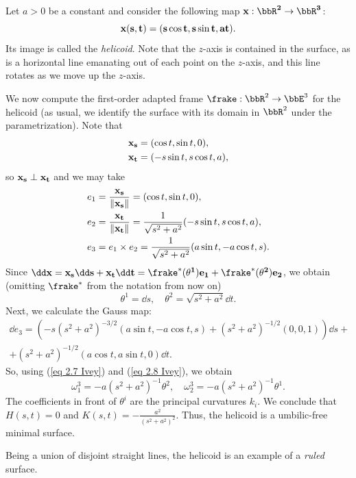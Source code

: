 \begin{example}[Helicoid]\label{ex helicoid}
    Let $a>0$ be a constant and consider the following map $\bf{x}:\bbR^2\to \bbR^3$:
    \[\bf{x}(s,t)=(s\cos t,s\sin t,at).\]
    Its image is called the \emph{helicoid}. Note that the $z$-axis is contained in the surface, as is a horizontal line emanating out of each point on the $z$-axis, and this line rotates as we move up the $z$-axis.
    
    We now compute the first-order adapted frame $\frake:\bbR^2\to \bbE^3$ for the helicoid (as usual, we identify the surface with its domain in $\bbR^2$ under the parametrization). Note that 
    \begin{align}
        \bf{x}_s&=(\cos t,\sin t,0),\\
        \bf{x}_t&=(-s\sin t,s\cos t,a),
    \end{align}
    so $\bf{x}_s\perp \bf{x}_t$ and we may take 
    \begin{align}
        e_1&=\frac{\bf{x}_s}{\lVert\bf{x}_s\rVert}=(\cos t,\sin t,0), \notag\\
        e_2&=\frac{\bf{x}_t}{\lVert\bf{x}_t\rVert}=\frac{1}{\sqrt{s^2+a^2}}(-s\sin t,s\cos t,a),\label{eq 2.7 Ivey}\\
        e_3&=e_1\times e_2=\frac{1}{\sqrt{s^2+a^2}}(a\sin t,-a\cos t,s).\notag
    \end{align}
    Since $\dd\bf{x}=\bf{x}_s\dd s+\bf{x}_t\dd t=\frake^\ast(\theta^1)e_1+\frake^\ast(\theta^2)e_2$, we obtain (omitting $\frake^\ast$ from the notation from now on)
    \[\theta^1=\dd s,\quad \theta^2=\sqrt{s^2+a^2} \dd t.\label{eq 2.8 Ivey}\]
    Next, we calculate the Gauss map:
    \begin{multline}
        \dd e_3=\left(-s\left(s^2+a^2\right)^{-3/2}(a\sin t,-a\cos t,s)+(s^2+a^2)^{-1/2}(0,0,1)\right)\dd s+\\
        +(s^2+a^2)^{-1/2}(a\cos t,a\sin t,0)\dd t.
    \end{multline}
    So, using (\ref{eq 2.7 Ivey}) and (\ref{eq 2.8 Ivey}), we obtain 
    \[\omega_1^3=-a(s^2+a^2)^{-1}\theta^2,\quad \omega_2^3=-a(s^2+a^2)^{-1}\theta^1.\]
    The coefficients in front of $\theta^i$ are the principal curvatures $k_i$. We conclude that $H(s,t)=0$ and $K(s,t)=-\frac{a^2}{(s^2+a^2)^2}$. Thus, the helicoid is a umbilic-free minimal surface.
\end{example}

Being a union of disjoint straight lines, the helicoid is an example of a \emph{ruled} surface.

